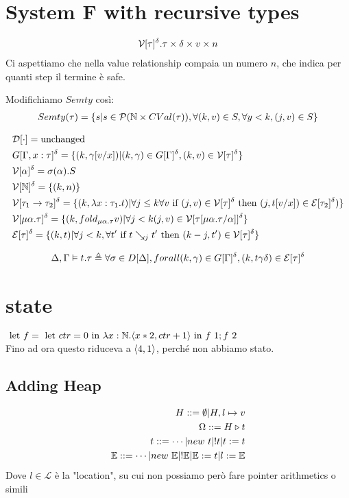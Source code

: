 \documentclass{article}
\begin{document}
\section{System F with recursive types}
\begin{align*}
    \mathcal{V}[\tau]^\delta.\tau\times\delta\times v\times n
\end{align*}
Ci aspettiamo che nella value relationship compaia un numero $n$, che indica per quanti step il termine è safe.

Modifichiamo $Semty$ così:
\begin{gather*}
    Semty(\tau)=\{s|s\in\mathcal{P}(\N\times CVal(\tau)),\forall(k,v)\in S,\forall y<k,(j,v)\in S\}
\end{gather*}

\begin{align*}
    & \mathcal{D}[\cdot] = \text{unchanged} \\
    & G[\Gamma,x:\tau]^\delta = \{(k,\gamma[v/x])|(k,\gamma)\in G[\Gamma]^\delta, (k,v)\in \mathcal{V}[\tau]^\delta\} \\
    & \mathcal{V}[\alpha]^\delta = \sigma(\alpha).S \\
    & \mathcal{V}[\mathbb N]^\delta = \{(k,n)\} \\
    & \mathcal{V}[\tau_1\to\tau_2]^\delta = \{(k,\lambda x:\tau_1.t)| \forall j\leq k \forall v \text{ if } (j,v)\in\mathcal{V}[\tau]^\delta \text{ then } (j,t[v/x])\in\mathcal{E}[\tau_2]^\delta)\} \\
    & \mathcal{V}[\mu\alpha.\tau]^\delta = \{(k,fold_{\mu\alpha.\tau}v)|\forall j<k (j,v)\in\mathcal{V}[\tau[\mu\alpha.\tau/\alpha]]^\delta \} \\
    & \mathcal{E}[\tau]^\delta = \{(k,t)|\forall j<k,\forall t' \text{ if } t\searrow_j t' \text{ then } (k-j,t')\in\mathcal{V}[\tau]^\delta\}
\end{align*}

\begin{gather*}
    \Delta,\Gamma\vDash t.\tau\triangleq \forall \sigma\in D[\Delta],forall(k,\gamma)\in G[\Gamma]^\delta, (k,t\gamma\delta)\in \mathcal{E}[\tau]^\delta
\end{gather*}

\section{state}
$\LET f=\LET ctr=0 \TIN \lam{x:\N}{\pair{x*2,ctr+1}\TIN f\ 1;f\ 2}$ \\
Fino ad ora questo riduceva a $\langle4,1\rangle$, perché non abbiamo stato.

\subsection{Adding Heap}
\begin{align*}
    H ::= \emptyset | H,l\mapsto v \\
    \Omega ::= H \triangleright t \\
    t ::= \cdots | new\ t | !t | t:= t \\
    \mathbb{E} ::= \cdots | new\ \mathbb{E} | !\mathbb{E} | \mathbb{E}:=t | l:=\mathbb{E}
\end{align*}
Dove $l\in\mathcal{L}$ è la "location", su cui non possiamo però fare pointer arithmetics o simili
\end{document}
